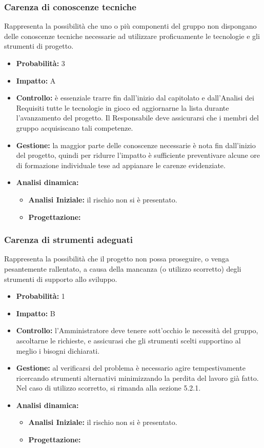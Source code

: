\documentclass[a4paper,11pt]{article}
\begin{document}
		\subsubsection{Carenza di conoscenze tecniche}
		Rappresenta la possibilità che uno o più componenti del gruppo non dispongano delle conoscenze tecniche necessarie ad utilizzare proficuamente le tecnologie e gli strumenti di progetto.
		\begin{itemize}
		\item \textbf{Probabilità: }3
		\item \textbf{Impatto: }A
		\item \textbf{Controllo:} è essenziale trarre fin dall'inizio dal capitolato e dall'Analisi dei Requisiti tutte le tecnologie in gioco ed aggiornarne la lista durante l'avanzamento del progetto. Il Responsabile deve assicurarsi che i membri del gruppo acquisiscano tali competenze.
		\item \textbf{Gestione:} la maggior parte delle conoscenze necessarie è nota fin dall'inizio del progetto, quindi per ridurre l'impatto è sufficiente preventivare alcune ore di formazione individuale tese ad appianare le carenze evidenziate.
		\item \textbf{Analisi dinamica:}
			\begin{itemize}
				\item\textbf{Analisi Iniziale:} il rischio non si è presentato.
				\item\textbf{Progettazione:}
			\end{itemize}
		\end{itemize}
		\subsubsection{Carenza di strumenti adeguati}
		Rappresenta la possibilità che il progetto non possa proseguire, o venga pesantemente rallentato, a causa della mancanza (o utilizzo scorretto) degli strumenti di supporto allo sviluppo.
		\begin{itemize}
		\item \textbf{Probabilità: }1
		\item \textbf{Impatto: }B
		\item \textbf{Controllo:} l'Amministratore deve tenere sott'occhio le necessità  del gruppo, ascoltarne le richieste, e assicurasi che gli strumenti scelti supportino al meglio i bisogni dichiarati.
		\item \textbf{Gestione:} al verificarsi del problema è necessario agire tempestivamente ricercando strumenti alternativi minimizzando la perdita del lavoro già fatto. Nel caso di utilizzo scorretto, si rimanda alla sezione 5.2.1.
		\item \textbf{Analisi dinamica:}
			\begin{itemize}
				\item\textbf{Analisi Iniziale:} il rischio non si è presentato.
				\item\textbf{Progettazione:} %
			\end{itemize}
		\end{itemize}
\end{document}
